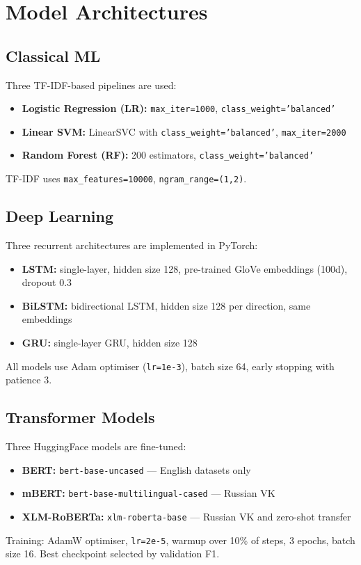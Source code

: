 \documentclass[12pt, a4paper, oneside]{report}
\begin{document}
\section{Model Architectures}

\subsection{Classical ML}

Three TF-IDF-based pipelines are used:
\begin{itemize}
    \item \textbf{Logistic Regression (LR):} \texttt{max\_iter=1000}, \texttt{class\_weight='balanced'}
    \item \textbf{Linear SVM:} LinearSVC with \texttt{class\_weight='balanced'}, \texttt{max\_iter=2000}
    \item \textbf{Random Forest (RF):} 200 estimators, \texttt{class\_weight='balanced'}
\end{itemize}
TF-IDF uses \texttt{max\_features=10000}, \texttt{ngram\_range=(1,2)}.

\subsection{Deep Learning}

Three recurrent architectures are implemented in PyTorch:
\begin{itemize}
    \item \textbf{LSTM:} single-layer, hidden size 128, pre-trained GloVe embeddings (100d), dropout 0.3
    \item \textbf{BiLSTM:} bidirectional LSTM, hidden size 128 per direction, same embeddings
    \item \textbf{GRU:} single-layer GRU, hidden size 128
\end{itemize}
All models use Adam optimiser (\texttt{lr=1e-3}), batch size 64, early stopping with patience 3.

\subsection{Transformer Models}

Three HuggingFace models are fine-tuned:
\begin{itemize}
    \item \textbf{BERT:} \texttt{bert-base-uncased} — English datasets only
    \item \textbf{mBERT:} \texttt{bert-base-multilingual-cased} — Russian VK
    \item \textbf{XLM-RoBERTa:} \texttt{xlm-roberta-base} — Russian VK and zero-shot transfer
\end{itemize}
Training: AdamW optimiser, \texttt{lr=2e-5}, warmup over 10\% of steps, 3 epochs, batch size 16. Best checkpoint selected by validation F1.
\end{document}
